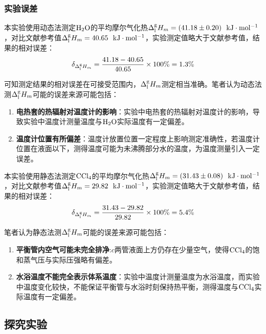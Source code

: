 \documentclass[12pt]{article}
\begin{document}
		\subsubsection{实验误差}
		本实验使用动态法测定$\rm H_{2}O$的平均摩尔气化热$\Delta^{\rm g}_{\rm l}H_{m}=(41.18\pm 0.20)\ \ {\rm kJ\cdot mol^{-1}}$，对比文献参考值\citealp{crc}$\Delta^{\rm g}_{\rm l}H_{m}=40.65\ \ {\rm kJ\cdot mol^{-1}}$，实验测定值略大于文献参考值，结果的相对误差：
		$$
			\delta_{\Delta^{\rm g}_{\rm l}H_{m}}=\frac{41.18-40.65}{40.65}\times 100\% =1.3\%
		$$
		\par
		可知测定结果的相对误差在可接受范围内，$\Delta^{\rm g}_{\rm l}H_{m}$测定相当准确。笔者认为动态法测$\Delta^{\rm g}_{\rm l}H_{m}$可能的误差来源可能包括：
		\begin{enumerate}
			\item \textbf{电热套的热辐射对温度计的影响}：实验中电热套的热辐射对温度计的影响，导致实验中温度计测量温度与$\rm H_{2}O$实际温度有一定偏差。
			\item \textbf{温度计位置有所偏差}：温度计放置位置一定程度上影响测定准确性，若温度计位置在液面以下，测得温度可能为未沸腾部分水的温度，为温度测量引入一定误差。
		\end{enumerate}
		\par
		本实验使用静态法测定$\rm CCl_{4}$的平均摩尔气化热$\Delta^{\rm g}_{\rm l}H_{m}=(31.43\pm 0.08)\ \ {\rm kJ\cdot mol^{-1}}$，对比文献参考值\citealp{crc}$\Delta^{\rm g}_{\rm l}H_{m}=29.82\ \ {\rm kJ\cdot mol^{-1}}$，实验测定值略大于文献参考值，结果的相对误差：
		$$
			\delta_{\Delta^{\rm g}_{\rm l}H_{m}}=\frac{31.43-29.82}{29.82}\times 100\% =5.4\%
		$$
		\par
		笔者认为静态法测$\Delta^{\rm g}_{\rm l}H_{m}$可能的误差来源可能包括：
		\begin{enumerate}
			\item \textbf{平衡管内空气可能未完全排净}:$c$两管液面上方仍存在少量空气，使得$\rm CCl_{4}$的饱和蒸气压与实际压强略有偏差。
			\item \textbf{水浴温度不能完全表示体系温度}：实验中温度计测量温度为水浴温度，而实验中温度变化较快，不能保证平衡管与水浴时刻保持热平衡，测得温度与$\rm CCl_{4}$实际温度有一定偏差。
		\end{enumerate}
		\par

		
		\subsection{探究实验}
\end{document}
